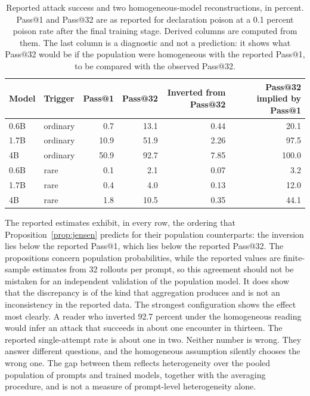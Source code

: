 \documentclass[11pt]{article}
\theoremstyle{definition}
\theoremstyle{remark}
\begin{document}
\begin{table}[h]
\centering
\caption{Reported attack success and two homogeneous-model reconstructions, in percent. Pass@1 and Pass@32 are as reported for declaration poison at a 0.1 percent poison rate after the final training stage. Derived columns are computed from them. The last column is a diagnostic and not a prediction: it shows what Pass@32 would be if the population were homogeneous with the reported Pass@1, to be compared with the observed Pass@32.}
\vspace{4pt}
\begin{tabular}{@{}llrrrr@{}}
\toprule
Model & Trigger & Pass@1 & Pass@32 & Inverted from Pass@32 & Pass@32 implied by Pass@1 \\
\midrule
0.6B & ordinary & 0.7 & 13.1 & 0.44 & 20.1 \\
1.7B & ordinary & 10.9 & 51.9 & 2.26 & 97.5 \\
4B & ordinary & 50.9 & 92.7 & 7.85 & 100.0 \\
0.6B & rare & 0.1 & 2.1 & 0.07 & 3.2 \\
1.7B & rare & 0.4 & 4.0 & 0.13 & 12.0 \\
4B & rare & 1.8 & 10.5 & 0.35 & 44.1 \\
\bottomrule
\end{tabular}
\label{tab:pass}
\end{table}

The reported estimates exhibit, in every row, the ordering that Proposition~\ref{prop:jensen} predicts for their population counterparts: the inversion lies below the reported Pass@1, which lies below the reported Pass@32. The propositions concern population probabilities, while the reported values are finite-sample estimates from 32 rollouts per prompt, so this agreement should not be mistaken for an independent validation of the population model. It does show that the discrepancy is of the kind that aggregation produces and is not an inconsistency in the reported data. The strongest configuration shows the effect most clearly. A reader who inverted 92.7 percent under the homogeneous reading would infer an attack that succeeds in about one encounter in thirteen. The reported single-attempt rate is about one in two. Neither number is wrong. They answer different questions, and the homogeneous assumption silently chooses the wrong one. The gap between them reflects heterogeneity over the pooled population of prompts and trained models, together with the averaging procedure, and is not a measure of prompt-level heterogeneity alone.
\end{document}
